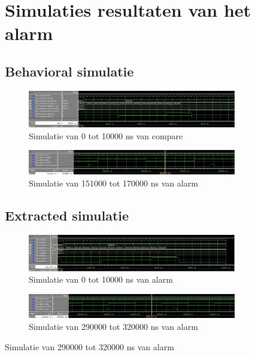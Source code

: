 \begin{figure}[ht!]
\chapter[Simulatie resultaten Alarm]{Simulaties resultaten van het alarm}
\label{Ap:sim_alarm}
\section{Behavioral simulatie}
\begin{figure}[ht!]
\includegraphics[width=\textwidth,height=\textheight,keepaspectratio]{Figuren/Alarm/Compare_beh.jpg}
\caption{Simulatie van 0 tot 10000 ns van compare}
\label{fig:sim_beh_compare}
\end{figure}
\begin{figure}[ht!]
\includegraphics[width=\textwidth,height=\textheight,keepaspectratio]{Figuren/Alarm/Alarm_beh.jpg}
\caption{Simulatie van 151000 tot 170000 ns van alarm}
\label{fig:sim_beh_alarm}
\end{figure}
\newpage
\section{Extracted simulatie}
\begin{figure}[ht!]
\includegraphics[width=\textwidth,height=\textheight,keepaspectratio]{Figuren/Alarm/Compare_ext.jpg}
\caption{Simulatie van 0 tot 10000 ns van alarm}
\label{fig:sim_ext_compare}
\end{figure}
\begin{figure}[ht!]
\includegraphics[width=\textwidth,height=\textheight,keepaspectratio]{Figuren/Alarm/Alarm_ext.jpg}
\caption{Simulatie van 290000 tot 320000 ns van alarm}
\label{fig:sim_ext_alarm}
\end{figure}


\end{figure}
